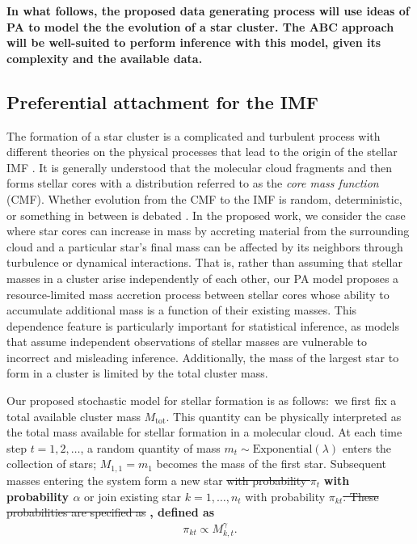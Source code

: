 \documentclass[ejs]{imsart}
\numberwithin{equation}{section}
\theoremstyle{plain}
\newcommand{\new}[1]{{\bf #1}}
\newcommand{\remove}[1]{\st{#1}}
\newcommand{\Mtot}{M_{\text{tot}}}
\begin{document}
\new{
In what follows, the proposed data generating process will use ideas of PA
to model the the evolution of a star cluster. The ABC approach will be
well-suited to perform inference with this model, given its complexity and
the available data.
}

\subsection{Preferential attachment for the IMF} \label{sec:pa}
The formation of a star cluster is a complicated and turbulent process with different theories on the physical processes that lead to the origin of the stellar IMF \citep{chabrier2005, Bate2012, OffnerEtAl2014, Pokhrel:2018nr}.  It is generally understood that the molecular cloud fragments and then forms stellar cores with a distribution referred to as the \emph{core mass function} (CMF).  Whether evolution from the CMF to the IMF is random, deterministic, or something in between is debated \citep{OffnerEtAl2014}.  In the proposed work, we consider the case where star cores can increase in mass by accreting material from the surrounding cloud and a particular star's final mass can be affected by its neighbors through turbulence or dynamical interactions.
%
That is, rather than assuming that stellar masses in a cluster arise independently of each other, our PA model proposes a resource-limited mass accretion process between stellar cores whose ability to accumulate additional mass is a function of their existing masses. 
This dependence feature is particularly important for statistical inference, as models that assume independent observations of stellar masses are vulnerable to incorrect and misleading inference. 
Additionally, the mass of the largest star to form in a cluster is limited by the total cluster mass.



Our proposed stochastic model for stellar formation is as follows:~we first fix a total available cluster mass $\Mtot$. 
This quantity can be physically interpreted as the total mass available for stellar formation in a molecular cloud. 
At each time step $t = 1, 2, \ldots$, a random quantity of mass $m_t \sim \text{Exponential}(\lambda)$ enters the collection of stars; $M_{1,1} = m_1$ becomes the mass of the first star.
Subsequent masses entering the system form a new star \remove{with probability $\pi_t$} \new{with probability $\alpha$} or join existing star $k = 1, \ldots, n_t$ with probability $\pi_{kt}$\remove{.
These probabilities are specified as} \new{, defined as}
\begin{align}
	\pi_{kt} \propto M_{k,t}^{\gamma}\text{.}
\label{eq:PAstars}
\end{align}
\end{document}
